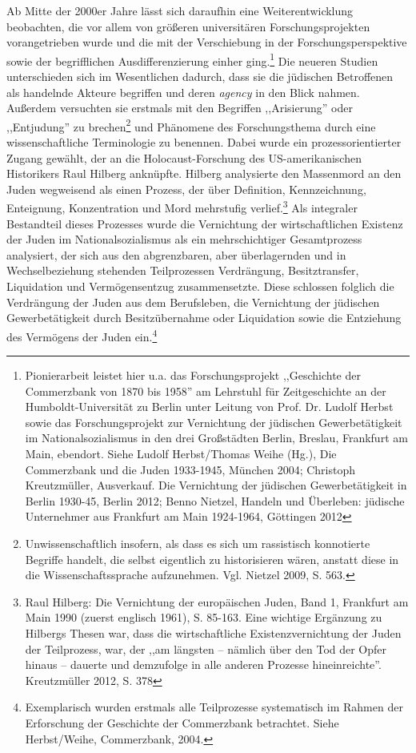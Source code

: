 Ab Mitte der 2000er Jahre lässt sich daraufhin eine Weiterentwicklung beobachten, die vor allem von größeren universitären Forschungsprojekten vorangetrieben wurde und die mit der Verschiebung in der Forschungsperspektive sowie der begrifflichen Ausdifferenzierung einher ging.\footnote{Pionierarbeit leistet hier u.a. das Forschungsprojekt ,,Geschichte der Commerzbank von 1870 bis 1958'' am Lehrstuhl für Zeitgeschichte an der Humboldt-Universität zu Berlin unter Leitung von Prof. Dr. Ludolf Herbst sowie das Forschungsprojekt zur Vernichtung der jüdischen Gewerbetätigkeit im Nationalsozialismus in den drei Großstädten Berlin, Breslau, Frankfurt am Main, ebendort. Siehe Ludolf Herbst/Thomas Weihe (Hg.), Die Commerzbank und die Juden 1933-1945, München 2004; Christoph Kreutzmüller, Ausverkauf. Die Vernichtung der jüdischen Gewerbetätigkeit in Berlin 1930-45, Berlin 2012; Benno Nietzel, Handeln und Überleben: jüdische Unternehmer aus Frankfurt am Main 1924-1964, Göttingen 2012} Die neueren Studien unterschieden sich im Wesentlichen dadurch, dass sie die jüdischen Betroffenen als handelnde Akteure begriffen und deren \textit{agency} in den Blick nahmen. Außerdem versuchten sie erstmals mit den Begriffen ,,Arisierung'' oder ,,Entjudung'' zu brechen\footnote{Unwissenschaftlich insofern, als dass es sich um rassistisch konnotierte Begriffe handelt, die selbst eigentlich zu historisieren wären, anstatt diese in die Wissenschaftssprache aufzunehmen. Vgl. Nietzel 2009, S. 563.} und Phänomene des Forschungsthema durch eine wissenschaftliche Terminologie zu benennen. Dabei wurde ein prozessorientierter Zugang gewählt, der an die Holocaust-Forschung des US-amerikanischen Historikers Raul Hilberg anknüpfte. Hilberg analysierte den Massenmord an den Juden wegweisend als einen Prozess, der über Definition, Kennzeichnung, Enteignung, Konzentration und Mord mehrstufig verlief.\footnote{Raul Hilberg: Die Vernichtung der europäischen Juden, Band 1, Frankfurt am Main 1990 (zuerst englisch 1961), S. 85-163. Eine wichtige Ergänzung zu Hilbergs Thesen war, dass die wirtschaftliche Existenzvernichtung der Juden der Teilprozess, war, der ,,am längsten – nämlich über den Tod der Opfer hinaus – dauerte und demzufolge in alle anderen Prozesse hineinreichte''. Kreutzmüller 2012, S. 378} Als integraler Bestandteil dieses Prozesses wurde die Vernichtung der wirtschaftlichen Existenz der Juden im Nationalsozialismus als ein mehrschichtiger Gesamtprozess analysiert, der sich aus den abgrenzbaren, aber überlagernden und in Wechselbeziehung stehenden Teilprozessen Verdrängung, Besitztransfer, Liquidation und Vermögensentzug zusammensetzte. Diese schlossen folglich die Verdrängung der Juden aus dem Berufsleben, die Vernichtung der jüdischen Gewerbetätigkeit durch Besitzübernahme oder Liquidation sowie die Entziehung des Vermögens der Juden ein.\footnote{Exemplarisch wurden erstmals alle Teilprozesse systematisch im Rahmen der Erforschung der Geschichte der Commerzbank betrachtet. Siehe Herbst/Weihe, Commerzbank, 2004.}

